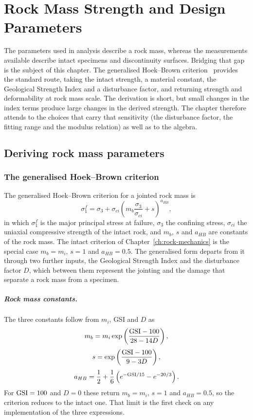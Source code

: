 \chapter{Rock Mass Strength and Design Parameters}
\label{ch:rock-mass-parameters}

The parameters used in analysis describe a rock mass, whereas the measurements
available describe intact specimens and discontinuity surfaces. Bridging that
gap is the subject of this chapter. The generalised Hoek--Brown
criterion~\citep{hoek2019hb} provides the standard route, taking the intact
strength, a material constant, the Geological Strength Index and a disturbance
factor, and returning strength and deformability at rock mass scale. The
derivation is short, but small changes in the
index terms produce large changes in the derived strength. The chapter
therefore attends
to the choices that carry that sensitivity (the disturbance factor, the
fitting range and the modulus relation) as well as to the algebra.

\section{Deriving rock mass parameters}
\label{sec:deriving-rock-mass-parameters}

\subsection{The generalised Hoek--Brown criterion}
\label{sec:the-generalised-hoek-brown-criterion}

The generalised Hoek--Brown criterion for a jointed rock mass is
\[
\sigma_1^f =
\sigma_3 +
\sigma_{ci}
\left(
m_b\frac{\sigma_3}{\sigma_{ci}} + s
\right)^{a_{HB}} ,
\]
in which \(\sigma_1^f\) is the major principal stress at failure, \(\sigma_3\)
the confining stress, \(\sigma_{ci}\) the uniaxial compressive strength of the
intact rock, and \(m_b\), \(s\) and \(a_{HB}\) are constants of the rock mass.
The intact criterion of Chapter~\ref{ch:rock-mechanics} is the special case
\(m_b = m_i\), \(s = 1\) and \(a_{HB} = 0.5\). The generalised form departs
from it through two further inputs, the Geological Strength Index and the
disturbance factor \(D\), which between them represent the jointing and the
damage that separate a rock mass from a specimen.

\paragraph{Rock mass constants.}
The three constants follow from \(m_i\), GSI and \(D\) as
\[
m_b =
m_i
\exp
\left(
\frac{\mathrm{GSI}-100}{28-14D}
\right) ,
\]
\[
s =
\exp
\left(
\frac{\mathrm{GSI}-100}{9-3D}
\right) ,
\]
\[
a_{HB} =
\frac{1}{2}
+
\frac{1}{6}
\left(
e^{-\mathrm{GSI}/15}
-
e^{-20/3}
\right) .
\]
For \(\mathrm{GSI} = 100\) and \(D = 0\) these return \(m_b = m_i\), \(s = 1\) and
\(a_{HB} = 0.5\), so the criterion reduces to the intact one. That limit is
the first check on any implementation of the three expressions.

